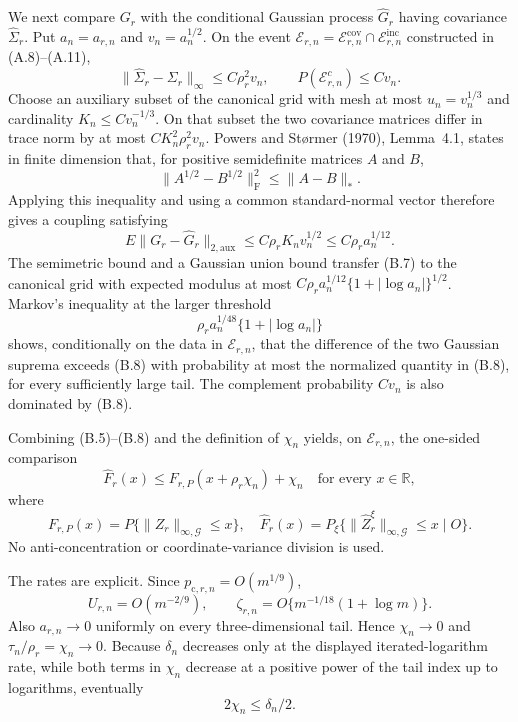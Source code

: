 We next compare \(G_r\) with the conditional Gaussian process \(\widehat G_r\) having covariance \(\widehat\Sigma_r\). Put \(a_n=a_{r,n}\) and \(v_n=a_n^{1/2}\). On the event \(\mathcal E_{r,n}=\mathcal E_{r,n}^{\mathrm{cov}}\cap\mathcal E_{r,n}^{\mathrm{inc}}\) constructed in (A.8)--(A.11),
\[
 \|\widehat\Sigma_r-\Sigma_r\|_\infty
 \le C\rho_r^2v_n,\qquad
 P(\mathcal E_{r,n}^c)\le Cv_n.                           \tag{B.6}
\]
Choose an auxiliary subset of the canonical grid with mesh at most \(u_n=v_n^{1/3}\) and cardinality \(K_n\le Cv_n^{-1/3}\). On that subset the two covariance matrices differ in trace norm by at most \(CK_n^2\rho_r^2v_n\). Powers and St{\o}rmer (1970), Lemma~4.1, states in finite dimension that, for positive semidefinite matrices \(A\) and \(B\),
\[
 \|A^{1/2}-B^{1/2}\|_{\mathrm F}^2\le\|A-B\|_*.
\]
Applying this inequality and using a common standard-normal vector therefore gives a coupling satisfying
\[
 E\|G_r-\widehat G_r\|_{2,\mathrm{aux}}
 \le C\rho_rK_nv_n^{1/2}\le C\rho_r a_n^{1/12}.          \tag{B.7}
\]
The semimetric bound and a Gaussian union bound transfer (B.7) to the canonical grid with expected modulus at most
\(C\rho_r a_n^{1/12}\{1+|\log a_n|\}^{1/2}\). Markov's inequality at the larger threshold
\[
 \rho_r a_n^{1/48}\{1+|\log a_n|\}                      \tag{B.8}
\]
shows, conditionally on the data in \(\mathcal E_{r,n}\), that the difference of the two Gaussian suprema exceeds (B.8) with probability at most the normalized quantity in (B.8), for every sufficiently large tail. The complement probability \(Cv_n\) is also dominated by (B.8).

Combining (B.5)--(B.8) and the definition of \(\chi_n\) yields, on \(\mathcal E_{r,n}\), the one-sided comparison
\[
 \widehat F_r(x)
 \le F_{r,P}(x+\rho_r\chi_n)+\chi_n
 \quad\text{for every }x\in\mathbb R,                    \tag{B.9}
\]
where
\[
 F_{r,P}(x)=P\{\|Z_r\|_{\infty,\mathcal G}\le x\},
 \quad
 \widehat F_r(x)=P_\xi\{\|\widehat Z_r^\xi\|_{\infty,\mathcal G}\le x\mid O\}.
\]
No anti-concentration or coordinate-variance division is used.

The rates are explicit. Since \(p_{\mathrm c,r,n}=O(m^{1/9})\),
\[
 U_{r,n}=O(m^{-2/9}),\qquad
 \zeta_{r,n}=O\{m^{-1/18}(1+\log m)\}.                   \tag{B.10}
\]
Also \(a_{r,n}\to0\) uniformly on every three-dimensional tail. Hence \(\chi_n\to0\) and \(\tau_n/\rho_r=\chi_n\to0\). Because \(\delta_n\) decreases only at the displayed iterated-logarithm rate, while both terms in \(\chi_n\) decrease at a positive power of the tail index up to logarithms, eventually
\[
 2\chi_n\le\delta_n/2.                                    \tag{B.11}
\]

